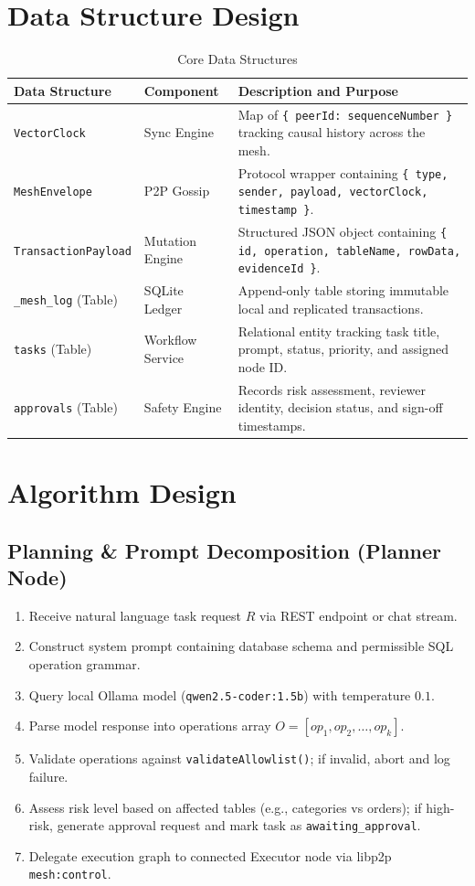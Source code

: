\documentclass[12pt,a4paper]{report}
\begin{document}
\section{Data Structure Design}
\begin{table}[H]
\centering
\caption{Core Data Structures}
\label{tab:data_struct}
\begin{tabularx}{\textwidth}{|l|l|X|}
\hline
\textbf{Data Structure} & \textbf{Component} & \textbf{Description and Purpose} \\
\hline
\texttt{VectorClock} & Sync Engine & Map of \texttt{\{ peerId: sequenceNumber \}} tracking causal history across the mesh. \\
\texttt{MeshEnvelope} & P2P Gossip & Protocol wrapper containing \texttt{\{ type, sender, payload, vectorClock, timestamp \}}. \\
\texttt{TransactionPayload} & Mutation Engine & Structured JSON object containing \texttt{\{ id, operation, tableName, rowData, evidenceId \}}. \\
\texttt{\_mesh\_log} (Table) & SQLite Ledger & Append-only table storing immutable local and replicated transactions. \\
\texttt{tasks} (Table) & Workflow Service & Relational entity tracking task title, prompt, status, priority, and assigned node ID. \\
\texttt{approvals} (Table) & Safety Engine & Records risk assessment, reviewer identity, decision status, and sign-off timestamps. \\
\hline
\end{tabularx}
\end{table}

\section{Algorithm Design}

\subsection{Planning \& Prompt Decomposition (Planner Node)}
\begin{enumerate}[label=\arabic*.,leftmargin=*,itemsep=2pt]
    \item Receive natural language task request $R$ via REST endpoint or chat stream.
    \item Construct system prompt containing database schema and permissible SQL operation grammar.
    \item Query local Ollama model (\texttt{qwen2.5-coder:1.5b}) with temperature $0.1$.
    \item Parse model response into operations array $O = [op_1, op_2, \dots, op_k]$.
    \item Validate operations against \texttt{validateAllowlist()}; if invalid, abort and log failure.
    \item Assess risk level based on affected tables (e.g., categories vs orders); if high-risk, generate approval request and mark task as \texttt{awaiting\_approval}.
    \item Delegate execution graph to connected Executor node via libp2p \texttt{mesh:control}.
\end{enumerate}
\end{document}

